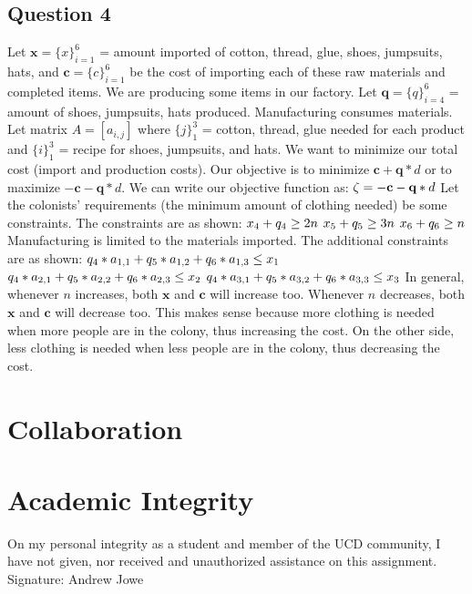 \documentclass{article}
\begin{document}
\subsection*{Question 4}
Let $\textbf{x} = \{x\}_{i=1}^6$ = amount imported of cotton, thread, glue, shoes, jumpsuits, hats, and $\textbf{c} = \{c\}_{i=1}^6$ be the cost of importing each of these raw materials and completed items.
\newline We are producing some items in our factory. Let $\textbf{q} = \{q\}_{i=4}^6$ = amount of shoes, jumpsuits, hats produced.
\newline Manufacturing consumes materials. Let matrix $A = [a_{i,j}]$ where $\{j\}_1^3$ = cotton, thread, glue needed for each product and $\{i\}_1^3$ = recipe for shoes, jumpsuits, and hats.
\newline We want to minimize our total cost (import and production costs). Our objective is to minimize $\textbf{c}+\textbf{q}*d$ or to maximize $-\textbf{c}-\textbf{q}*d$. We can write our objective function as:
$\\\zeta = -\textbf{c}-\textbf{q}*d$
\newline Let the colonists' requirements (the minimum amount of clothing needed) be some constraints. The constraints are as shown:
$\\x_4 + q_4 \geq 2n$
$\\x_5 + q_5 \geq 3n$
$\\x_6 + q_6 \geq n$
\newline Manufacturing is limited to the materials imported. The additional constraints are as shown:
$\\q_4*a_{1,1} + q_5*a_{1,2} + q_6*a_{1,3} \leq x_1$
$\\q_4*a_{2,1} + q_5*a_{2,2} + q_6*a_{2,3} \leq x_2$
$\\q_4*a_{3,1} + q_5*a_{3,2} + q_6*a_{3,3} \leq x_3$
\newline In general, whenever $n$ increases, both $\textbf{x}$ and $\textbf{c}$ will increase too. Whenever $n$ decreases, both $\textbf{x}$ and $\textbf{c}$ will decrease too. This makes sense because more clothing is needed when more people are in the colony, thus increasing the cost. On the other side, less clothing is needed when less people are in the colony, thus decreasing the cost.

\newpage
\section*{Collaboration}

\newpage
\section*{Academic Integrity}
On my personal integrity as a student and member of the UCD community, I have not given, nor received and unauthorized assistance on this assignment.
\newline Signature: Andrew Jowe
\end{document}

